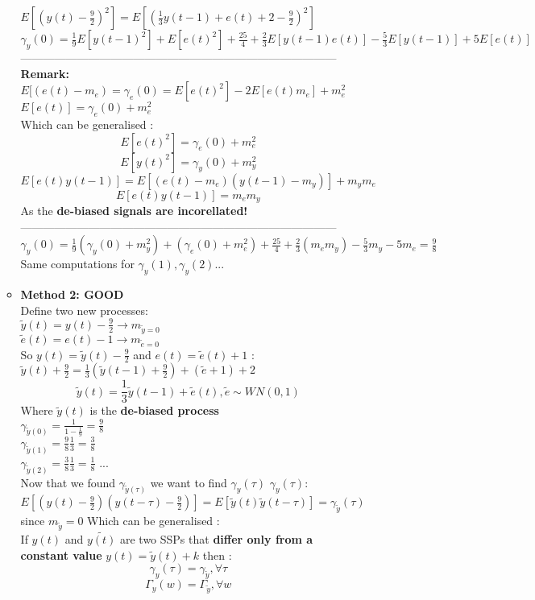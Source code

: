 \begin{description}
\begin{itemize}
\begin{itemize}
$ E[(y(t)-\frac{9}{2})^2] = E[(\frac{1}{3}y(t-1)+e(t)+2-\frac{9}{2})^2]$\\
$ \gamma_y(0) = \frac{1}{9}E[y(t-1)^2]+E[e(t)^2]+\frac{25}{4} + \frac{2}{3}E[y(t-1)e(t)]-\frac{5}{3}E[y(t-1)]+5E[e(t)]$\\
------------------------------------------------------------------------------------\\
\textbf{Remark:} $E[(e(t)-m_e) = \gamma_e(0) =E[e(t)^2]-2E[e(t)m_e] + m_e^2$ \\ 
$E[e(t)]= \gamma_e(0) + m_e^2$ \\
Which can be generalised : \\
\[
\boxed{E[e(t)^2]= \gamma_e(0)+m_e^2}
\]
\[
\boxed{E[y(t)^2]= \gamma_y(0)+m_y^2}
\] 
$E[e(t)y(t-1)]= E[(e(t)-m_e)(y(t-1)-m_y)]+m_ym_e$
\[
\boxed{E[e(t)y(t-1)]= m_em_y}
\]
As the \textbf{de-biased signals are incorellated!}\\
------------------------------------------------------------------------------------\\
$\gamma_y(0) = \frac{1}{9}(\gamma_y(0)+m_y^2)+(\gamma_e(0) + m_e^2)+ \frac{25}{4} + \frac{2}{3}(m_em_y)-\frac{5}{3}m_y-5m_e = \frac{9}{8}$
Same computations for $\gamma_y(1),\gamma_y(2)...$
\item \textbf{Method 2: GOOD}\\
Define two new processes: \\
$ \tilde{y}(t) = y(t) - \frac{9}{2} \to m_{\tilde{y} = 0}$\\
$ \tilde{e}(t) = e(t) - 1 \to m_{\tilde{e}=0}$\\
So $ y(t) = \tilde{y}(t) - \frac{9}{2} $ and $ e(t) = \tilde{e}(t) + 1$  : \\
$ \tilde{y}(t)+\frac{9}{2} = \frac{1}{3}(\tilde{y}(t-1)+\frac{9}{2}) + (\tilde{e}+1)+2$
\[
\boxed{\tilde{y}(t) = \frac{1}{3}\tilde{y}(t-1)+\tilde{e}(t), \tilde{e} \sim WN(0,1)}
\]
Where $\tilde{y}(t)$ is the \textbf{de-biased process}\\
$\gamma_{\tilde{y}(0)} = \frac{1}{1-\frac{1}{9}} = \frac{9}{8}$\\
$\gamma_{\tilde{y}(1)} = \frac{9}{8}\frac{1}{3} = \frac{3}{8}$\\
$\gamma_{\tilde{y}(2)} = \frac{3}{8}\frac{1}{3} = \frac{1}{8}$   ...\\
Now that we found $\gamma_{\tilde{y}(\tau)}$ we want to find $\gamma_y(\tau)$
$ \gamma_y(\tau) $: \\$E[(y(t)-\frac{9}{2})(y(t-\tau)-\frac{9}{2})] = E[\tilde{y}(t)\tilde{y}(t-\tau)]=\gamma_{\tilde{y}}(\tau)$  \\ since $m_{\tilde{y}}=0$
Which can be generalised :\\
If  $y(t)$ and $\tilde{y(t)}$ are two SSPs that \textbf{differ only from a constant value} $y(t) = \tilde{y}(t)+k$ then :
\[
\boxed{\gamma_y(\tau)= \gamma_{\tilde{y}} , \forall \tau}
\]
\[
\boxed{\Gamma_y(w)= \Gamma_{\tilde{y}} ,\forall w}
\]
\end{itemize}
\end{itemize}
\end{description}
